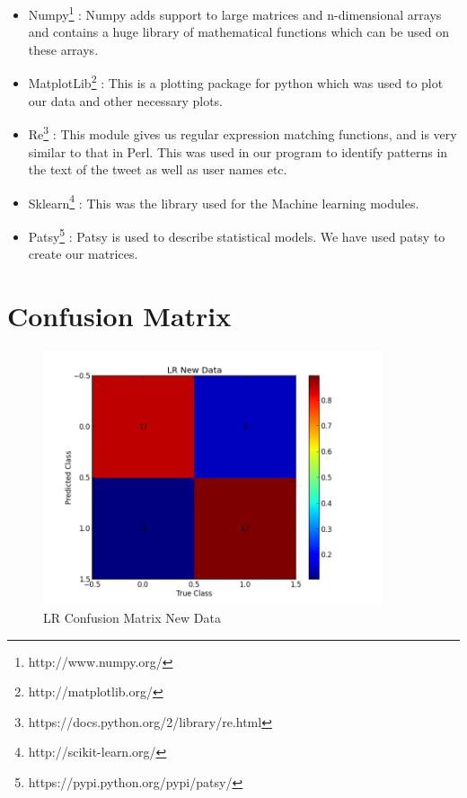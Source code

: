 \begin{itemize}
\begin{itemize}
\end{itemize}
\item Numpy\footnote{http://www.numpy.org/}  : Numpy adds support to large matrices and n-dimensional arrays and contains a huge library of mathematical functions which can be used on these arrays. 
\item MatplotLib\footnote{http://matplotlib.org/}  : This is a plotting package for python which was used to plot our data and other necessary plots. 
\item Re\footnote{https://docs.python.org/2/library/re.html}  : This module gives us regular expression matching functions, and is very similar to that in Perl. This was used in our program to identify patterns in the text of the tweet as well as user names etc. 
\item Sklearn\footnote{http://scikit-learn.org/}  : This was the library used for the Machine learning modules. 
\item Patsy\footnote{https://pypi.python.org/pypi/patsy/}  : Patsy is used to describe statistical models. We have used patsy to create our matrices. 
\end{itemize}

\section{Confusion Matrix}
\begin{figure}[!h]
 \centering
\includegraphics[width=10cm]{LRCMNewData}
  \caption[LR Confusion Matrix New Data]
   {LR Confusion Matrix New Data}
\end{figure}\leavevmode 

